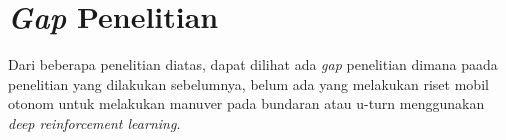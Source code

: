 \section{\textit{Gap} Penelitian}
\label{sec:gap_penelitian}

Dari beberapa penelitian diatas, dapat dilihat ada \textit{gap} penelitian dimana paada penelitian yang dilakukan sebelumnya, belum ada yang melakukan riset mobil otonom untuk melakukan manuver pada bundaran atau u-turn menggunakan \textit{deep reinforcement learning}.
